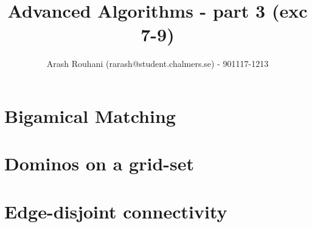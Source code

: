 \documentclass[a4paper,11pt]{article}
\title{Advanced Algorithms - part 3 (exc 7-9)}
\author{Arash Rouhani (rarash@student.chalmers.se) - 901117-1213}
\begin{document}
\maketitle


\section{Bigamical Matching}

\section{Dominos on a grid-set}

\section{Edge-disjoint connectivity}
\end{document}

